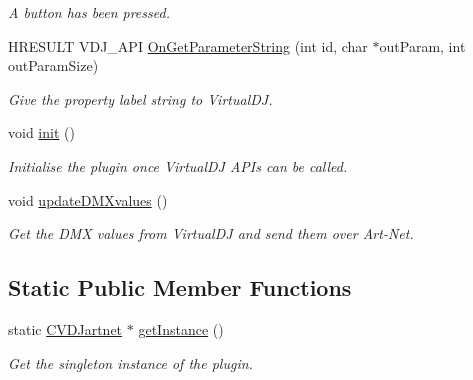 \begin{DoxyCompactItemize}
\begin{DoxyCompactList}\small\item\em A button has been pressed. \end{DoxyCompactList}\item 
\mbox{\label{classCVDJartnet_a2b6a30190c13882c67bee402a3069c6a}} 
H\+R\+E\+S\+U\+LT V\+D\+J\+\_\+\+A\+PI \hyperlink{classCVDJartnet_a2b6a30190c13882c67bee402a3069c6a}{On\+Get\+Parameter\+String} (int id, char $\ast$out\+Param, int out\+Param\+Size)
\begin{DoxyCompactList}\small\item\em Give the property label string to Virtual\+DJ. \end{DoxyCompactList}\item 
\mbox{\label{classCVDJartnet_aed57c58c3ca5fe51181244bd745a2d75}} 
void \hyperlink{classCVDJartnet_aed57c58c3ca5fe51181244bd745a2d75}{init} ()
\begin{DoxyCompactList}\small\item\em Initialise the plugin once Virtual\+DJ A\+P\+Is can be called. \end{DoxyCompactList}\item 
\mbox{\label{classCVDJartnet_a195690a1e5100b728ddf9da7a5d0608d}} 
void \hyperlink{classCVDJartnet_a195690a1e5100b728ddf9da7a5d0608d}{update\+D\+M\+Xvalues} ()
\begin{DoxyCompactList}\small\item\em Get the D\+MX values from Virtual\+DJ and send them over Art-\/\+Net. \end{DoxyCompactList}\end{DoxyCompactItemize}
\subsection*{Static Public Member Functions}
\begin{DoxyCompactItemize}
\item 
\mbox{\label{classCVDJartnet_a34007cb1abb536fc1c50c54e42c970f8}} 
static \hyperlink{classCVDJartnet}{C\+V\+D\+Jartnet} $\ast$ \hyperlink{classCVDJartnet_a34007cb1abb536fc1c50c54e42c970f8}{get\+Instance} ()
\begin{DoxyCompactList}\small\item\em Get the singleton instance of the plugin. \end{DoxyCompactList}\end{DoxyCompactItemize}
